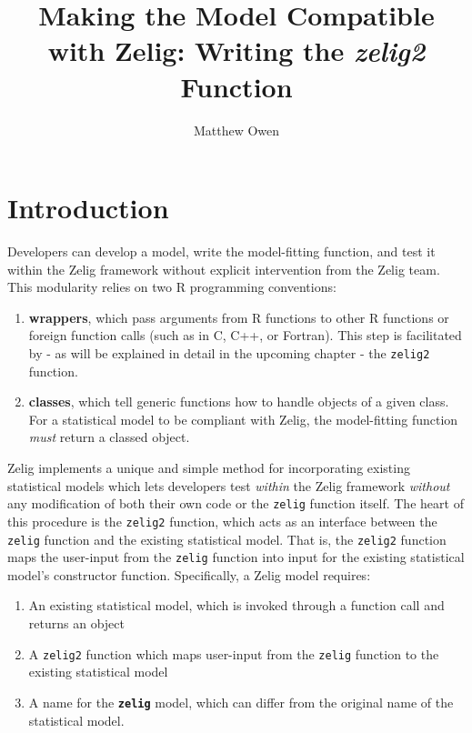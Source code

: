 \documentclass[11pt]{article}
\begin{document}
\title{Making the Model Compatible with Zelig: Writing the \emph{zelig2} Function}
\author{Matthew Owen}
\maketitle


\section{Introduction}
Developers can develop a model, write the model-fitting function, and test it
within the Zelig framework without explicit intervention from the Zelig team. 
This modularity relies on two R programming conventions:


\begin{enumerate}

	\item {\bf wrappers}, which pass arguments from R functions to other R functions
		or foreign function calls (such as in C, C++, or Fortran).  This step is
		facilitated by - as will be explained in detail in the upcoming chapter -
		the {\tt zelig2} function.
		
	\item {\bf classes}, which tell generic functions how to handle objects of a given
		class.  For a statistical model to be compliant with Zelig, the model-fitting
		function \emph{must} return a classed object.
		
\end{enumerate}

Zelig implements a unique and simple method for incorporating existing statistical
models which lets developers test \emph{within} the Zelig framework \emph{without} any
modification of both their own code or the {\tt zelig} function itself.  The heart of
this procedure is the {\tt zelig2} function, which acts as an interface between the
{\tt zelig} function and the existing statistical model.  That is, the {\tt zelig2}
function maps the user-input from the {\tt zelig} function into input for the existing
statistical model's constructor function.  Specifically, a Zelig model requires:

%
\begin{enumerate}

	\item An existing statistical model, which is invoked through a function call and
		returns an object

	\item A {\tt zelig2} function which maps user-input from the {\tt zelig} function to
		the existing statistical model
		
	\item A name for the {\tt \bf zelig} model, which can differ from the original name of
		the statistical model.
		
\end{enumerate}
\end{document}
